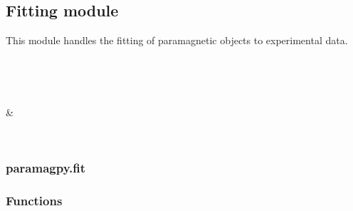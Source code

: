 \documentclass[a4paper,10pt,english]{sphinxmanual}
\begin{document}
\subsection{Fitting module}
\label{\detokenize{reference/index:fitting-module}}
This module handles the fitting of paramagnetic objects to experimental data.


\begin{savenotes}\sphinxatlongtablestart\begin{longtable}{}
\hline

\endfirsthead

%
{}\\
\hline

\endhead

\hline
{}\\
\endfoot

\endlastfoot

{\hyperref[\detokenize{reference/generated/paramagpy.fit:module-paramagpy.fit}]{}}
&

\\
\hline
\end{longtable}\sphinxatlongtableend\end{savenotes}


\subsubsection{paramagpy.fit}
\label{\detokenize{reference/generated/paramagpy.fit:module-paramagpy.fit}}\label{\detokenize{reference/generated/paramagpy.fit:paramagpy-fit}}\label{\detokenize{reference/generated/paramagpy.fit::doc}}\subsubsection*{Functions}
\end{document}
